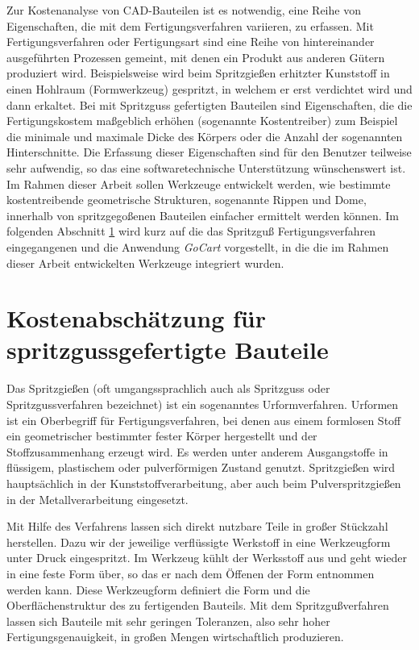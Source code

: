 Zur Kostenanalyse von CAD-Bauteilen ist es notwendig, eine Reihe von Eigenschaften, die mit dem Fertigungsverfahren variieren, zu erfassen. Mit Fertigungsverfahren oder Fertigungsart sind eine Reihe von hintereinander ausgef\"uhrten Prozessen gemeint, mit denen ein Produkt aus anderen G\"utern produziert wird. Beispielsweise wird beim Spritzgie{\ss}en erhitzter Kunststoff in einen Hohlraum (Formwerkzeug) gespritzt, in welchem er erst verdichtet wird und dann erkaltet. Bei mit Spritzguss gefertigten Bauteilen sind Eigenschaften, die die Fertigungskostem ma{\ss}geblich erh\"ohen (sogenannte Kostentreiber) zum Beispiel die minimale und maximale Dicke des K\"orpers oder die Anzahl der sogenannten Hinterschnitte. Die Erfassung dieser Eigenschaften sind f\"ur den Benutzer teilweise sehr aufwendig, so das eine softwaretechnische Unterst\"utzung w\"unschenswert ist. Im Rahmen dieser Arbeit sollen Werkzeuge entwickelt werden, wie bestimmte kostentreibende geometrische Strukturen, sogenannte Rippen und Dome, innerhalb von spritzgego{\ss}enen Bauteilen einfacher ermittelt werden k\"onnen. Im folgenden Abschnitt \ref{injection} wird kurz auf die das Spritzgu{\ss} Fertigungsverfahren eingegangenen und die Anwendung \textit{GoCart} vorgestellt, in die die im Rahmen dieser Arbeit entwickelten Werkzeuge integriert wurden.
 
\section{Kostenabsch\"atzung f\"ur spritzgussgefertigte Bauteile}
\label{injection}

Das Spritzgie{\ss}en (oft umgangssprachlich auch als Spritzguss oder Spritzgussverfahren bezeichnet) ist ein sogenanntes Urformverfahren. Urformen ist ein Oberbegriff f\"ur Fertigungsverfahren, bei denen aus einem formlosen Stoff ein geometrischer bestimmter fester K\"orper hergestellt und der Stoffzusammenhang erzeugt wird. Es werden unter anderem Ausgangstoffe in fl\"ussigem, plastischem oder pulverförmigen Zustand genutzt. Spritzgie{\ss}en wird haupts\"achlich in der Kunststoffverarbeitung, aber auch beim Pulverspritzgie{\ss}en in der Metallverarbeitung eingesetzt.

Mit Hilfe des Verfahrens lassen sich direkt nutzbare Teile in gro{\ss}er St\"uckzahl herstellen. Dazu wir der jeweilige verfl\"ussigte  Werkstoff in eine Werkzeugform unter Druck eingespritzt. Im Werkzeug k\"uhlt der Werksstoff aus und geht wieder in eine feste Form \"uber, so das er nach dem \"Offenen der Form entnommen werden kann. Diese Werkzeugform definiert die Form und die Oberfl\"achenstruktur des zu fertigenden Bauteils. Mit dem Spritzgu{\ss}verfahren lassen sich Bauteile mit sehr geringen Toleranzen, also sehr hoher Fertigungsgenauigkeit, in gro{\ss}en Mengen wirtschaftlich produzieren. 

